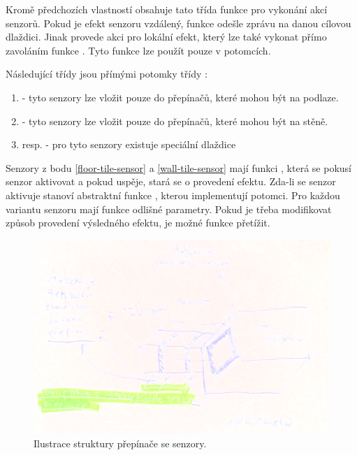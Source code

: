 Kromě předchozích vlastností obsahuje tato třída funkce pro vykonání akcí senzorů. Pokud je efekt senzoru vzdálený, funkce   odešle zprávu 
na danou cílovou dlaždici. Jinak provede akci pro lokální efekt, který lze 
také vykonat přímo zavoláním funkce . Tyto funkce lze použít pouze v potomcích.

Následující třídy jsou přímými potomky třídy :

\begin{enumerate}
\item\label{floor-tile-sensor}  - tyto senzory lze vložit pouze do přepínačů, které mohou být na podlaze.
\item\label{wall-tile-sensor}  - tyto senzory lze vložit pouze do přepínačů, které mohou být na stěně.
\item {} resp.  - pro tyto senzory existuje speciální dlaždice 
\end{enumerate}

Senzory z bodu \ref{floor-tile-sensor} a \ref{wall-tile-sensor} mají funkci , která se pokusí senzor 
aktivovat a pokud uspěje, stará se o provedení efektu. Zda-li se senzor aktivuje stanoví abstraktní funkce ,
kterou implementují potomci. Pro každou variantu senzoru mají funkce odlišné parametry. Pokud je třeba modifikovat způsob 
provedení výsledného efektu, je možné funkce  přetížit.

\begin{figure}[H]\centering
\includegraphics[width=\textwidth]{./img/decoration-actuator.png}
\caption{Ilustrace struktury přepínače se senzory.}
\label{decoration-actuator}
\end{figure}


